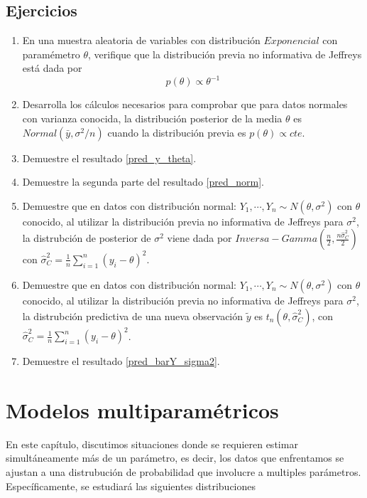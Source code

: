 \documentclass[10pt,openright]{book}\usepackage[]{graphicx}\usepackage[]{color}
\begin{document}
\section{Ejercicios}
\begin{enumerate}
\item En una muestra aleatoria de variables con distribuci\'on $Exponencial$ con param\'emetro $\theta$, verifique que la distribuci\'on previa no informativa de Jeffreys est\'a dada por
\begin{equation}
p(\theta)\propto \theta^{-1}
\end{equation}
\item\label{XXX} Desarrolla los c\'alculos necesarios para comprobar que para datos normales con varianza conocida, la distribuci\'on posterior de la media $\theta$ es $Normal(\bar{y},\sigma^2/n)$ cuando la distribuci\'on previa es $p(\theta)\propto cte$. 
\item Demuestre el resultado \ref{pred_y_theta}.
\item\label{Ejer_pre_Jeffreys} Demuestre la segunda parte del resultado \ref{pred_norm}.
\item Demuestre que en datos con distribuci\'on normal: $Y_1,\cdots,Y_n\sim N(\theta,\sigma^2)$ con $\theta$ conocido, al utilizar la distribuci\'on previa no informativa de Jeffreys para $\sigma^2$, la distrubci\'on de posterior de $\sigma^2$ viene dada por $Inversa-Gamma(\frac{n}{2},\frac{n\hat{\sigma}^2_C}{2})$ con $\hat{\sigma}^2_C=\frac{1}{n}\sum_{i=1}^n(y_i-\theta)^2$. 
\item\label{pre_y_sigma2_Jeffreys} Demuestre que en datos con distribuci\'on normal: $Y_1,\cdots,Y_n\sim N(\theta,\sigma^2)$ con $\theta$ conocido, al utilizar la distribuci\'on previa no informativa de Jeffreys para $\sigma^2$, la distrubci\'on predictiva de una nueva observaci\'on $\tilde{y}$ es $t_n(\theta,\hat{\sigma}^2_C)$, con $\hat{\sigma}^2_C=\frac{1}{n}\sum_{i=1}^n(y_i-\theta)^2$. 
\item Demuestre el resultado \ref{pred_barY_sigma2}.
\end{enumerate}



    


 
\chapter{Modelos multiparam\'etricos}
En este cap\'itulo, discutimos situaciones donde se requieren estimar simult\'aneamente m\'as de un par\'ametro, es decir, los datos que enfrentamos se ajustan a una distrubuci\'on de probabilidad que involucre a multiples par\'ametros. Espec\'ificamente, se estudiar\'a las siguientes distribuciones
\end{document}
